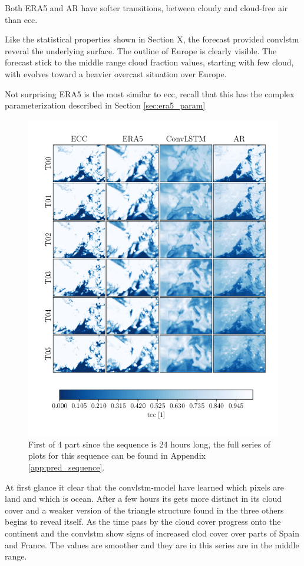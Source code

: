 Both ERA5 and AR have softer transitions, between cloudy and cloud-free air than \acrshort{ecc}.

Like the statistical properties shown in Section X, the forecast provided \acrshort{convlstm} reveral the underlying surface. The outline of Europe is clearly visible. The forecast stick to the middle range cloud fraction values, starting with few cloud, with evolves toward a heavier overcast situation over Europe. 

Not surprising ERA5 is the most similar to \acrshort{ecc}, recall that this has the complex parameterization described in Section \ref{sec:era5_param}


\begin{figure}[ht]
    \centering
    \includegraphics[sale=0.1]{python_figs/comparing_seq_part_1_of4_jan2.png}
    \caption{First of 4 part since the sequence is 24 hours long, the full series of plots for this sequence can be found in Appendix \ref{app:pred_sequence}.}
    \label{fig:pred_sequence}
\end{figure}
At first glance it clear that the \acrshort{convlstm}-model have learned which pixels are land and which is ocean. After a few hours its gets more distinct in its cloud cover and a weaker version of the triangle structure found in the three others begins to reveal itself. As the time pass by the cloud cover progress onto the continent and the \acrshort{convlstm} show signs of increased clod cover over parts of Spain and France.
The values are smoother and they are in this series are in the middle range.

